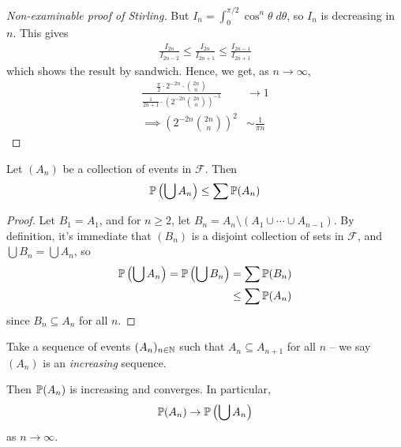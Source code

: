 \documentclass{../../template/note}
\begin{document}
\begin{proof}[Non-examinable proof of Stirling]
        But \(I_n = \int_0^{\pi/2} \cos^n \theta \; d\theta\), so \(I_n\) is decreasing in \(n\). This gives
        \begin{align*}
            \frac{I_{2n}}{I_{2n-2}} \leq \frac{I_{2n}}{I_{2n+1}} \leq \frac{I_{2n-1}}{I_{2n+1}}
        \end{align*}
        which shows the result by sandwich. Hence, we get, as \(n \to \infty\),
        \begin{align*}
            \frac{\frac{\pi}2 \cdot 2^{-2n} \cdot \binom{2n}{n}}{\frac{1}{2n+1} \cdot \left(2^{-2n} \binom{2n}{n}\right)^{-1}} &\to 1 \\ \implies \left(2^{-2n} \binom{2n}{n}\right)^2 &\sim \frac{1}{\pi n}
        \end{align*}        
    \end{proof}
    
    \begin{proposition}
        Let \((A_n)\) be a collection of events in \(\mathcal F\). Then
        \begin{align*}
            \mathbb P\left(\bigcup A_n\right) \leq \sum \mathbb P(A_n)
        \end{align*}
    \end{proposition}
    
    \begin{proof}
        Let \(B_1 = A_1\), and for \(n \geq 2\), let \(B_n = A_n \setminus (A_1 \cup \cdots \cup A_{n-1})\). By definition, it's immediate that \((B_n)\) is a disjoint collection of sets in \(\mathcal F\), and \(\bigcup B_n = \bigcup A_n\), so
        \begin{align*}
            \mathbb P\left(\bigcup A_n\right) = \mathbb P\left(\bigcup B_n\right) &= \sum \mathbb P(B_n) \\
            &\leq \sum \mathbb P(A_n)
        \end{align*}
        since \(B_n \subseteq A_n\) for all \(n\).
    \end{proof}
    
    \begin{proposition}
        \label{continuity}
        Take a sequence of events \((A_n)_{n \in \mathbb N}\) such that \(A_n \subseteq A_{n+1}\) for all \(n\) -- we say \((A_n)\) is an \emph{increasing} sequence.

        Then \(\mathbb P(A_n)\) is increasing and converges. In particular,
        \begin{align*}
            \mathbb P(A_n) \to \mathbb P\left(\bigcup A_n\right)
        \end{align*}
        as \(n \to \infty\).
    \end{proposition}
    
\end{document}
